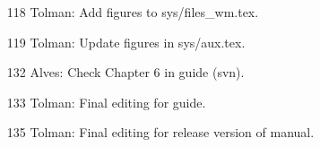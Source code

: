\begin{itemize}
\item[118] Tolman: Add figures to sys/files\_wm.tex.

\item[119] Tolman: Update figures in sys/aux.tex.

\item [132] Alves: Check Chapter 6 in guide (svn).

\item [133] Tolman: Final editing for guide. 

\item [135] Tolman: Final editing for release version of manual.

\end{itemize}

\bpage
\pagestyle{empty}
